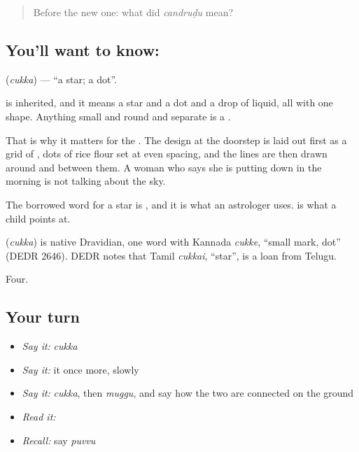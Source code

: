 \begin{quote}
Before the new one: what did \emph{candruḍu} mean?
\end{quote}

\subsection*{You'll want to know: }
\textbf{} (\emph{cukka}) — \textquotedblleft{}a star; a dot\textquotedblright{}.

 is inherited, and it means a star and a dot and a drop of liquid, all with one shape. Anything small and round and separate is a .

That is why it matters for the . The design at the doorstep is laid out first as a grid of , dots of rice flour set at even spacing, and the lines are then drawn around and between them. A woman who says she is putting down  in the morning is not talking about the sky.

The borrowed word for a star is , and it is what an astrologer uses.  is what a child points at.

\begin{cousinweb}
\textbf{} (\emph{cukka}) is native Dravidian, one word with Kannada \emph{cukke}, \textquotedblleft{}small mark, dot\textquotedblright{} (DEDR 2646). DEDR notes that Tamil \emph{cukkai}, \textquotedblleft{}star\textquotedblright{}, is a loan from Telugu.
\end{cousinweb}

\begin{grammarlens}[title={What you've built}]
Four.
\end{grammarlens}

\subsection*{Your turn}
\begin{itemize}
\raggedright
  \item \emph{Say it:} \emph{cukka}
  \item \emph{Say it:} it once more, slowly
  \item \emph{Say it:} \emph{cukka}, then \emph{muggu}, and say how the two are connected on the ground
  \item \emph{Read it:} \textbf{}
  \item \emph{Recall:} say \emph{puvvu}
\end{itemize}

